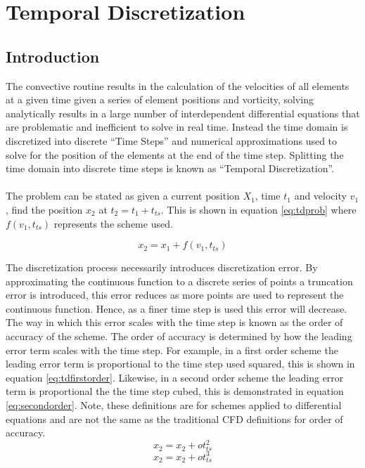 \section{Temporal Discretization}
\subsection{Introduction}
The convective routine results in the calculation of the velocities of all elements at a given time given a series of element positions and vorticity, solving analytically results in a large number of interdependent differential equations that are problematic and inefficient to solve in real time. Instead the time domain is discretized into discrete “Time Steps” and numerical approximations used to solve for the position of the elements at the end of the time step. Splitting the time domain into discrete time steps is known as “Temporal Discretization”.
\\\\
The problem can be stated as given a current position $X_{1}$, time $t_{1}$ and velocity $v_{1}$, find the position $x_{2}$ at $t_{2}=t_{1}+t_{ts}$. This is shown in equation \ref{eq:tdprob} where $f(v_{1},t_{ts})$ represents the scheme used.

\begin{equation}
\label{eq:tdprob}
x_{2}=x_{1}+f(v_{1},t_{ts})
\end{equation}

The discretization process necessarily introduces discretization error. By approximating the continuous function to a discrete series of  points a truncation error is introduced, this error reduces as more points are used to represent the continuous function. Hence, as a finer time step is used this error will decrease. The way in which this error scales with the time step is known as the order of accuracy of the scheme. The order of accuracy is determined by how the leading error term scales with the time step. For example, in a first order scheme the leading error term is proportional to the time step used squared, this is shown in equation \ref{eq:tdfirstorder}. Likewise, in a second order scheme the leading error term is proportional the the time step cubed, this is demonstrated in equation \ref{eq:secondorder}. Note, these definitions are for schemes applied to differential equations and are not the same as the traditional CFD definitions for order of accuracy.
\begin{equation}
\label{eq:tdfirstorder}
x_{2}=x_{2}+ot_{ts}^2
\end{equation}
\begin{equation}
\label{eq:secondorder}
x_{2}=x_{2}+ot_{ts}^3
\end{equation}

